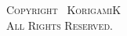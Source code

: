 \begin{titlepage}
\begin{center}
    \end{center}
    \begin{center}

    \end{center}
    \begin{center}
        \vfill
        \small\textsc{Copyright \textcopyright\, KorigamiK}\\
        \small\textsc{All Rights Reserved.}
    \end{center}
\end{titlepage}
\newpage
